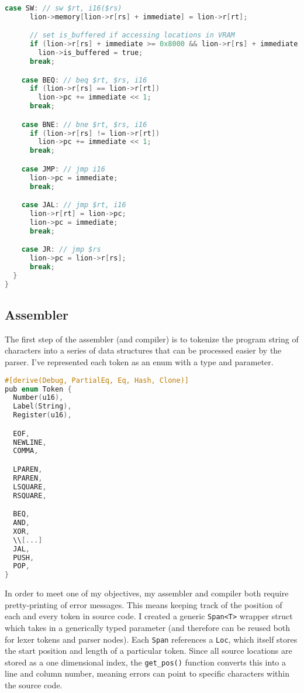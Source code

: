 \begin{lstlisting}[language=C]
    case SW: // sw $rt, i16($rs)
      lion->memory[lion->r[rs] + immediate] = lion->r[rt];

      // set is_buffered if accessing locations in VRAM
      if (lion->r[rs] + immediate >= 0x8000 && lion->r[rs] + immediate <= 0x8800)
        lion->is_buffered = true;
      break;

    case BEQ: // beq $rt, $rs, i16
      if (lion->r[rs] == lion->r[rt])
        lion->pc += immediate << 1;
      break;

    case BNE: // bne $rt, $rs, i16
      if (lion->r[rs] != lion->r[rt])
        lion->pc += immediate << 1;
      break;

    case JMP: // jmp i16
      lion->pc = immediate;
      break;

    case JAL: // jmp $rt, i16
      lion->r[rt] = lion->pc;
      lion->pc = immediate;
      break;

    case JR: // jmp $rs
      lion->pc = lion->r[rs];
      break;
  }
}
\end{lstlisting}

\subsection{Assembler}
The first step of the assembler (and compiler) is to tokenize the program string of characters into a series of data structures that can be processed easier by the parser. I've represented each token as an enum with a type and parameter. 

\begin{lstlisting}[language=C]
#[derive(Debug, PartialEq, Eq, Hash, Clone)]
pub enum Token {
  Number(u16),
  Label(String),
  Register(u16),

  EOF,
  NEWLINE,
  COMMA,

  LPAREN,
  RPAREN,
  LSQUARE,
  RSQUARE,

  BEQ,
  AND,
  XOR,
  \\[...]
  JAL,
  PUSH,
  POP,
}
\end{lstlisting}

In order to meet one of my objectives, my assembler and compiler both require pretty-printing of error messages. This means keeping track of the position of each and every token in source code. I created a generic \texttt{Span<T>} wrapper struct which takes in a generically typed parameter (and therefore can be reused both for lexer tokens and parser nodes). Each \texttt{Span} references a \texttt{Loc}, which itself stores the start position and length of a particular token. Since all source locations are stored as a one dimensional index, the \texttt{get\_pos()} function converts this into a line and column number, meaning errors can point to specific characters within the source code.

